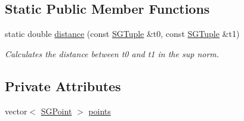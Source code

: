 \subsection*{Static Public Member Functions}
\begin{DoxyCompactItemize}
\item 
\mbox{\label{classSGTuple_a84f49c6d705bbe457e0e74e32316d25b}} 
static double \hyperlink{classSGTuple_a84f49c6d705bbe457e0e74e32316d25b}{distance} (const \hyperlink{classSGTuple}{S\+G\+Tuple} \&t0, const \hyperlink{classSGTuple}{S\+G\+Tuple} \&t1)
\begin{DoxyCompactList}\small\item\em Calculates the distance between t0 and t1 in the sup norm. \end{DoxyCompactList}\end{DoxyCompactItemize}
\subsection*{Private Attributes}
\begin{DoxyCompactItemize}
\item 
vector$<$ \hyperlink{classSGPoint}{S\+G\+Point} $>$ \hyperlink{classSGTuple_a2d9f4a67e7230c46d189eb4472417255}{points}
\end{DoxyCompactItemize}
